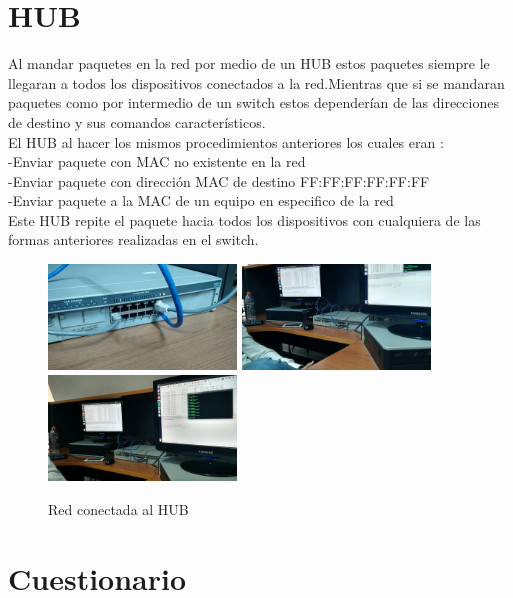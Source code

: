 \documentclass{udpreport}
\begin{document}
	\section{HUB}
	 	Al mandar paquetes en la red por medio de un HUB estos paquetes siempre 
 		le llegaran a todos los dispositivos conectados a la red.Mientras que si
 		se mandaran paquetes como por intermedio de un switch estos dependerían de 
 		las direcciones de destino  y sus comandos característicos.\\
 		El HUB al hacer  los mismos procedimientos anteriores los cuales eran :\\
 		-Enviar paquete con MAC no existente en la red\\
 		-Enviar paquete con dirección MAC de destino FF:FF:FF:FF:FF:FF\\
 		-Enviar paquete a la MAC de un equipo en especifico de la red\\
 		Este HUB repite el paquete hacia todos los dispositivos con cualquiera
 		de las formas anteriores realizadas en el switch.
 		\begin{figure}[H]
	\centering
	\includegraphics[width=5cm]{hub.jpg}
	\includegraphics[width=5cm]{hub_pc.jpg}
	\includegraphics[width=5cm]{Paquete_pchub2.jpg}
	\caption{Red conectada al HUB}
	\end{figure}
	\section{Cuestionario}
	
\end{document}
